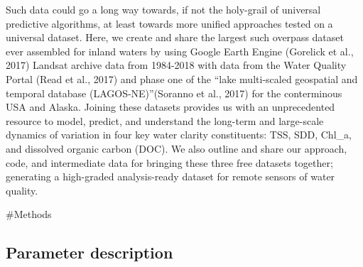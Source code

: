 \documentclass[]{article}
\begin{document}
Such data could go a long way towards, if not the holy-grail of
universal predictive algorithms, at least towards more unified
approaches tested on a universal dataset. Here, we create and share the
largest such overpass dataset ever assembled for inland waters by using
Google Earth Engine (Gorelick et al., 2017) Landsat archive data from
1984-2018 with data from the Water Quality Portal (Read et al., 2017)
and phase one of the ``lake multi-scaled geospatial and temporal
database (LAGOS-NE)''(Soranno et al., 2017) for the conterminous USA and
Alaska. Joining these datasets provides us with an unprecedented
resource to model, predict, and understand the long-term and large-scale
dynamics of variation in four key water clarity constituents: TSS, SDD,
Chl\_a, and dissolved organic carbon (DOC). We also outline and share
our approach, code, and intermediate data for bringing these three free
datasets together; generating a high-graded analysis-ready dataset for
remote sensors of water quality.

\#Methods

\hypertarget{parameter-description}{%
\subsection{Parameter description}\label{parameter-description}}
\end{document}

